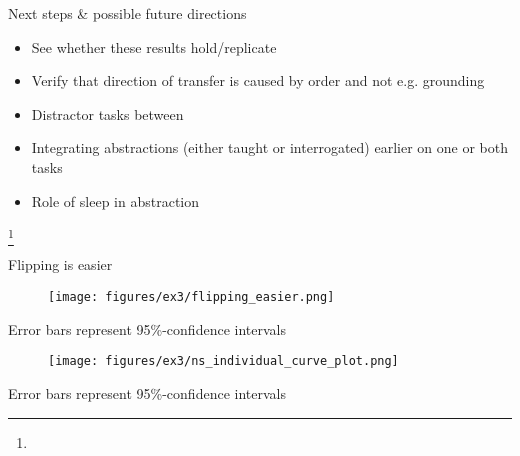 \documentclass{beamer}
\newcommand\blfootnote[1]{%
  \begingroup
  \renewcommand\thefootnote{}\footnote{#1}%
  \addtocounter{footnote}{-1}%
  \endgroup
}
\begin{document}
\begin{frame}{Next steps \& possible future directions}
\begin{itemize}
\item See whether these results hold/replicate 
\item<2-> Verify that direction of transfer is caused by order and not e.g. grounding
\item<3-> Distractor tasks between
\item<4-> Integrating abstractions (either taught or interrogated) earlier on one or both tasks
\item<5-> Role of sleep in abstraction
\end{itemize}
\end{frame}

\begin{frame}[allowframebreaks]

\blfootnote{}
\end{frame}

\appendix

\begin{frame}{Flipping is easier}
\begin{figure}
\centering
\texttt{[image: figures/ex3/flipping\_easier.png]}
\end{figure}
{\scriptsize Error bars represent 95\%-confidence intervals}
\end{frame}

\begin{frame}
\begin{figure}
\centering
\texttt{[image: figures/ex3/ns\_individual\_curve\_plot.png]}
\end{figure}
{\scriptsize Error bars represent 95\%-confidence intervals}
\end{frame}
\end{document}

